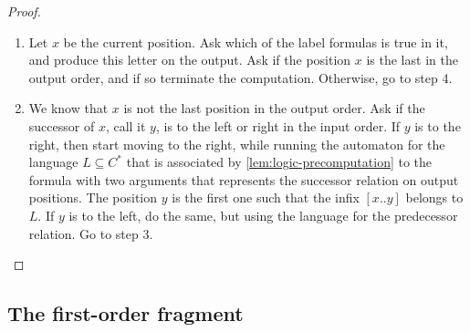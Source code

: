 \begin{proof}
\begin{enumerate}
        \item Let $x$ be the current position. Ask which of the label formulas is true in it, and produce this letter on the output. Ask if the position $x$ is the last in the output order, and if so terminate the computation. Otherwise, go to step 4.
        \item We know that $x$ is not the last position in the output order. Ask if the successor of $x$, call it $y$, is to the left or right in the input order. If $y$ is to the right, then start moving to the right, while running the automaton for the language $L \subseteq C^*$ that is associated  by \cref{lem:logic-precomputation} to the formula with two arguments that represents the successor relation on output positions. The position $y$ is the first one such that the infix $[x..y]$ belongs to $L$. If $y$ is to the left, do the same, but using the language  for the predecessor relation. Go to step 3. 
    \end{enumerate}

    
\end{proof}


\subsection{The first-order fragment}
\label{sec:logic-aperiodic}
\newcommand{\fotype}{\text{tp}}


